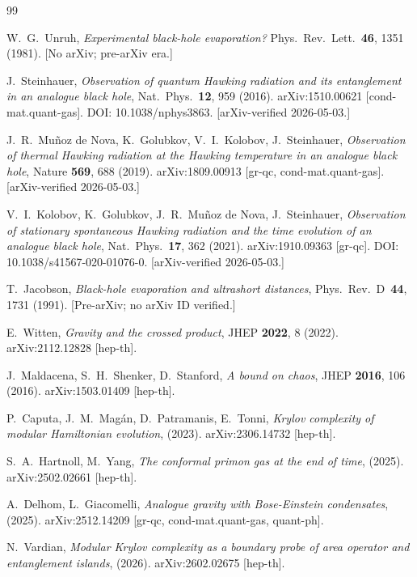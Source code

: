 \documentclass[12pt,a4paper]{article}
\begin{document}
\begin{thebibliography}{99}

W.~G.~Unruh,
\emph{Experimental black-hole evaporation?}
Phys.\ Rev.\ Lett.\ \textbf{46}, 1351 (1981).
[No arXiv; pre-arXiv era.]

J.~Steinhauer,
\emph{Observation of quantum Hawking radiation and its entanglement in an analogue black hole},
Nat.\ Phys.\ \textbf{12}, 959 (2016).
arXiv:1510.00621 [cond-mat.quant-gas].
DOI: 10.1038/nphys3863.
[arXiv-verified 2026-05-03.]

J.~R.~Mu{\~n}oz de Nova, K.~Golubkov, V.~I.~Kolobov, J.~Steinhauer,
\emph{Observation of thermal Hawking radiation at the Hawking temperature in an analogue black hole},
Nature \textbf{569}, 688 (2019).
arXiv:1809.00913 [gr-qc, cond-mat.quant-gas].
[arXiv-verified 2026-05-03.]

V.~I.~Kolobov, K.~Golubkov, J.~R.~Mu{\~n}oz de Nova, J.~Steinhauer,
\emph{Observation of stationary spontaneous Hawking radiation and the time evolution of an analogue black hole},
Nat.\ Phys.\ \textbf{17}, 362 (2021).
arXiv:1910.09363 [gr-qc].
DOI: 10.1038/s41567-020-01076-0.
[arXiv-verified 2026-05-03.]

T.~Jacobson,
\emph{Black-hole evaporation and ultrashort distances},
Phys.\ Rev.\ D~\textbf{44}, 1731 (1991).
[Pre-arXiv; no arXiv ID verified.]

E.~Witten,
\emph{Gravity and the crossed product},
JHEP \textbf{2022}, 8 (2022).
arXiv:2112.12828 [hep-th].

J.~Maldacena, S.~H.~Shenker, D.~Stanford,
\emph{A bound on chaos},
JHEP \textbf{2016}, 106 (2016).
arXiv:1503.01409 [hep-th].

P.~Caputa, J.~M.~Mag\'an, D.~Patramanis, E.~Tonni,
\emph{Krylov complexity of modular Hamiltonian evolution},
(2023).
arXiv:2306.14732 [hep-th].

S.~A.~Hartnoll, M.~Yang,
\emph{The conformal primon gas at the end of time},
(2025).
arXiv:2502.02661 [hep-th].

A.~Delhom, L.~Giacomelli,
\emph{Analogue gravity with Bose-Einstein condensates},
(2025).
arXiv:2512.14209 [gr-qc, cond-mat.quant-gas, quant-ph].

N.~Vardian,
\emph{Modular Krylov complexity as a boundary probe of area operator and entanglement islands},
(2026).
arXiv:2602.02675 [hep-th].


\end{thebibliography}
\end{document}
